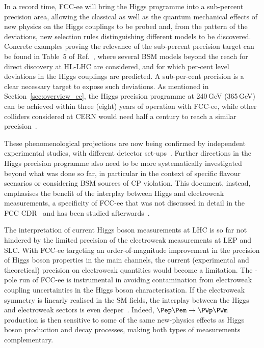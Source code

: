 In a record time, FCC-ee will bring the Higgs programme into a sub-percent precision area, 
allowing the classical as well as the quantum mechanical effects of new physics on the Higgs couplings to be probed and, 
from the pattern of the deviations, new selection rules distinguishing different models to be discovered. 
Concrete examples proving the relevance of the sub-percent precision target can be found in Table~5 of Ref.~\cite{Barklow:2017suo}, 
where several BSM models beyond the reach for direct discovery at HL-LHC are considered, 
and for which per-cent level deviations in the Higgs couplings are predicted. 
A sub-per-cent precision is a clear necessary target to expose such deviations.
As mentioned in Section~\ref{sec:overview_ee}, the Higgs precision programme at 240\,GeV (365\,GeV) 
can be achieved within three (eight) years of operation with FCC-ee, 
while other colliders considered at CERN would need half a century to reach a similar precision~\cite{Blondel:2024mry}.

These phenomenological projections are now being confirmed by independent experimental studies, 
with different detector set-ups~\cite{HiggsNoteRecoil, note_Higgs_to_hadrons, HiggsInvisibleNote}. 
Further directions in the Higgs precision programme also need to be more systematically investigated beyond what was done so far, 
in particular in the context of specific flavour scenarios or considering BSM sources of CP violation. 
This document, instead, emphasises the benefit of the interplay between Higgs and electroweak measurements, 
a specificity of FCC-ee that was not discussed in detail in the FCC CDR~\cite{fcc-phys-cdr, fcc-ee-cdr} 
and has been studied afterwards~\cite{DeBlas:2019qco, deBlas:2022ofj}.

The interpretation of current Higgs boson measurements at LHC is so far not hindered by the limited precision of the electroweak measurements at LEP and SLC. 
With FCC-ee targeting an order-of-magnitude improvement in the precision of Higgs boson properties in the main channels, 
the current (experimental and theoretical) precision on electroweak quantities would become a limitation. 
The \PZ-pole run of FCC-ee is instrumental in avoiding contamination from electroweak coupling uncertainties in the Higgs boson characterisation. 
If the electroweak symmetry is linearly realised in the SM fields, 
the interplay between the Higgs and electroweak sectors is even deeper~\cite{Gupta:2014rxa}.
Indeed, $\epem \to \PWp\PWm$ production is then sensitive to some of the same new-physics effects as Higgs boson production and decay processes, 
making both types of measurements complementary.

